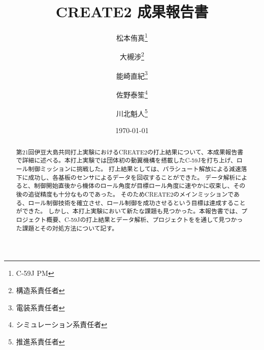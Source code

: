 \documentclass[a4paper,11pt,uplatex]{jsarticle}
\title{CREATE2 成果報告書}
\date{\today}
\author{松本侑真\thanks{C-59J PM}\and{大槻渉}\thanks{構造系責任者}
\and{能崎直紀}\thanks{電装系責任者}\and{佐野泰笙}\thanks{シミュレーション系責任者}
\and{川北魁人}\thanks{推進系責任者}}
\begin{document}
\maketitle


\begin{abstract}
    第21回伊豆大島共同打上実験におけるCREATE2の打上結果について、本成果報告書で詳細に述べる。本打上実験では団体初の動翼機構を搭載したC-59Jを打ち上げ、ロール制御ミッションに挑戦した。
    打上結果としては、パラシュート解放による減速落下に成功し、各基板のセンサによるデータを回収することができた。
    データ解析によると、制御開始直後から機体のロール角度が目標ロール角度に速やかに収束し、その後の追従精度も十分なものであった。
    そのためCREATE2のメインミッションである、ロール制御技術を確立させ、ロール制御を成功させるという目標は達成することができた。
    しかし、本打上実験において新たな課題も見つかった。本報告書では、プロジェクト概要、C-59Jの打上結果とデータ解析、プロジェクトをを通して見つかった課題とその対処方法について記す。
\end{abstract}
\newpage
\tableofcontents
\newpage








\end{document}
